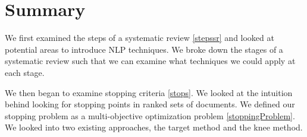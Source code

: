 \section{Summary} \label{sumlit}

We first examined the steps of a systematic review \ref{stepssr} and looked at potential areas to introduce NLP techniques. We broke down the stages of a systematic review such that we can examine what techniques we could apply at each stage. 

We then began to examine stopping criteria \ref{stops}. We looked at the intuition behind looking for stopping points in ranked sets of documents. We defined our stopping problem as a multi-objective optimization problem \ref{stoppingProblem}. We looked into two existing approaches, the target method and the knee method.



